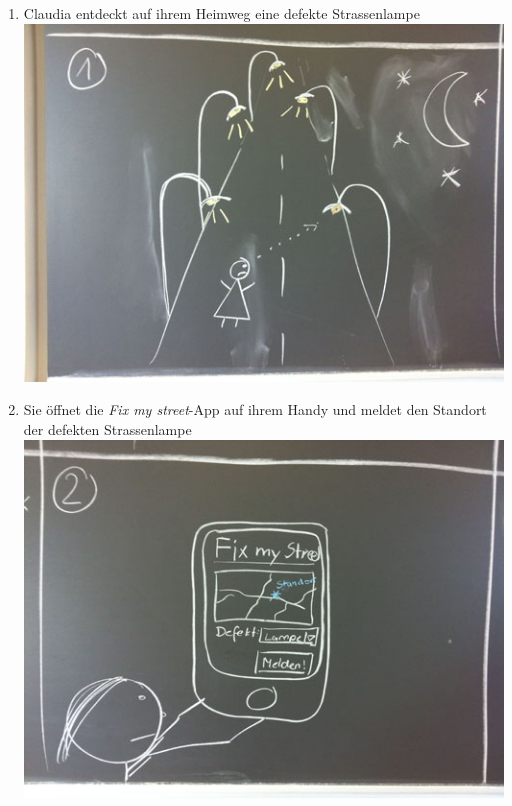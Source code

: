 \begin{enumerate}
\item Claudia entdeckt auf ihrem Heimweg eine defekte Strassenlampe \\ \includegraphics[scale=0.4]{images/usecase2-fixmystreet/storyboard/fixmystreet-storyboard-1.jpg}
\item Sie öffnet die \emph{Fix my street}-App auf ihrem Handy und meldet den Standort der defekten Strassenlampe \\ \includegraphics[scale=0.4]{images/usecase2-fixmystreet/storyboard/fixmystreet-storyboard-2.jpg}

\end{enumerate}
